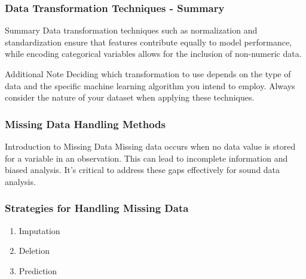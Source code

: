 \documentclass[aspectratio=169]{beamer}
\begin{document}
\begin{frame}[fragile]
    \frametitle{Data Transformation Techniques - Summary}
    \begin{block}{Summary}
        Data transformation techniques such as normalization and standardization ensure that features contribute equally to model performance, while encoding categorical variables allows for the inclusion of non-numeric data.
    \end{block}

    \begin{block}{Additional Note}
        Deciding which transformation to use depends on the type of data and the specific machine learning algorithm you intend to employ. Always consider the nature of your dataset when applying these techniques.
    \end{block}
\end{frame}

\begin{frame}[fragile]
    \frametitle{Missing Data Handling Methods}
    \begin{block}{Introduction to Missing Data}
        Missing data occurs when no data value is stored for a variable in an observation. This can lead to incomplete information and biased analysis. It’s critical to address these gaps effectively for sound data analysis.
    \end{block}
\end{frame}

\begin{frame}[fragile]
    \frametitle{Strategies for Handling Missing Data}
    \begin{enumerate}
        \item Imputation
        \item Deletion
        \item Prediction
    \end{enumerate}
\end{frame}
\end{document}
